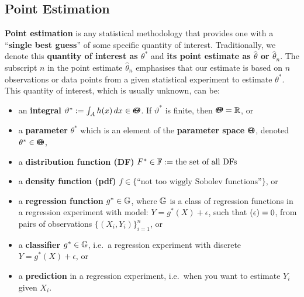 \subsection{Point Estimation}\label{S:PointEstimation}
{\bf Point estimation} is any statistical methodology that provides one with a ``{\bf single best guess}'' of some specific quantity of interest.  Traditionally, we denote this {\bf quantity of interest as $\theta^*$} and {\bf its point estimate as $\widehat{\theta}$ or $\widehat{\theta}_n$}.  The subscript $n$ in the point estimate $\widehat{\theta}_n$ emphasises that our estimate is based on $n$ observations or data points from a given statistical experiment to estimate $\theta^*$.  This quantity of interest, which is usually unknown, can be: %
\begin{itemize}
\item an {\bf integral} $\vartheta^* := \int_A h(x)\,dx \in {\varTheta}\mspace{-11 mu}{\varTheta}$.  If $\vartheta^*$ is finite, then ${\varTheta}\mspace{-11 mu}{\varTheta} =  \mathbb{R}$, or %
\item a {\bf parameter} $\theta^*$ which is an element of the {\bf parameter space} ${\Theta}\mspace{-11 mu}{\Theta}$, denoted $\theta^* \in {\Theta}\mspace{-11 mu}{\Theta}$,
\item a {\bf distribution function (DF)} $F^* \in \mathbb{F} := \text{the set of all DFs}$
\item a {\bf density function (pdf)} $f \in \{ \text{``not too wiggly Sobolev functions''} \}$, or 
\item a {\bf regression function} $g^* \in \mathbb{G}$, where $\mathbb{G}$ is a class of regression functions in a regression experiment with model: $Y=g^*(X)+\epsilon$, such that $\mathscr{(}\epsilon)=0$, from pairs of observations $\{(X_i,Y_i)\}_{i=1}^n$, or
\item a {\bf classifier} $g^* \in \mathbb{G}$, i.e.~a regression experiment with discrete $Y = g^*(X)+\epsilon$, or 
\item a {\bf prediction} in a regression experiment, i.e.~when you want to estimate $Y_i$ given $X_i$. 
\end{itemize}

